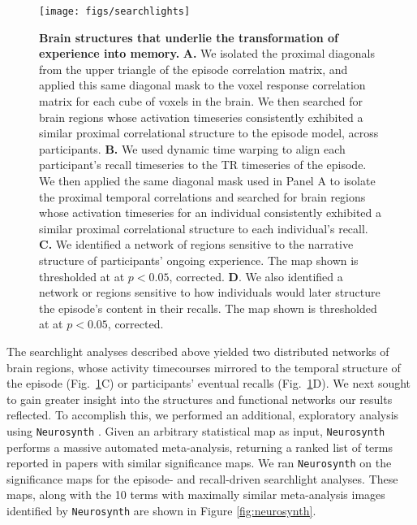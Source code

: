 \documentclass{article}
\begin{document}
\begin{figure}[t]
\centering
\texttt{[image: figs/searchlights]}
\caption{\small \textbf{Brain structures that underlie the transformation of experience into memory.} \textbf{A.} We isolated the proximal diagonals from the upper triangle of the episode correlation matrix, and applied this same diagonal mask to the voxel response correlation matrix for each cube of voxels in the brain. We then searched for brain regions whose activation timeseries consistently exhibited a similar proximal correlational structure to the episode model, across participants.  \textbf{B.} We used dynamic time warping \citep{BernClif94} to align each participant's recall timeseries to the TR timeseries of the episode.  We then applied the same diagonal mask used in Panel A to isolate the proximal temporal correlations and searched for brain regions whose activation timeseries for an individual consistently exhibited a similar proximal correlational structure to each individual's recall.  \textbf{C.} We identified a network of regions sensitive to the narrative structure of participants' ongoing experience.  The map shown is thresholded at at $p < 0.05$, corrected.  \textbf{D}. We also identified a network or regions sensitive to how individuals would later structure the episode's content in their recalls.  The map shown is thresholded at at $p < 0.05$, corrected.}
\label{fig:brainz}
\end{figure}

The searchlight analyses described above yielded two distributed networks of brain regions, whose activity timecourses mirrored to the temporal structure of the episode (Fig.~\ref{fig:brainz}C) or participants' eventual recalls (Fig.~\ref{fig:brainz}D).  We next sought to gain greater insight into the structures and functional networks our results reflected.  To accomplish this, we performed an additional, exploratory analysis using \texttt{Neurosynth} \citep{YarkEtal11}.  Given an arbitrary statistical map as input, \texttt{Neurosynth} performs a massive automated meta-analysis, returning a ranked list of terms reported in papers with similar significance maps. We ran \texttt{Neurosynth} on the significance maps for the episode- and recall-driven searchlight analyses. These maps, along with the 10 terms with maximally similar meta-analysis images identified by \texttt{Neurosynth} are shown in Figure \ref{fig:neurosynth}.
\end{document}
